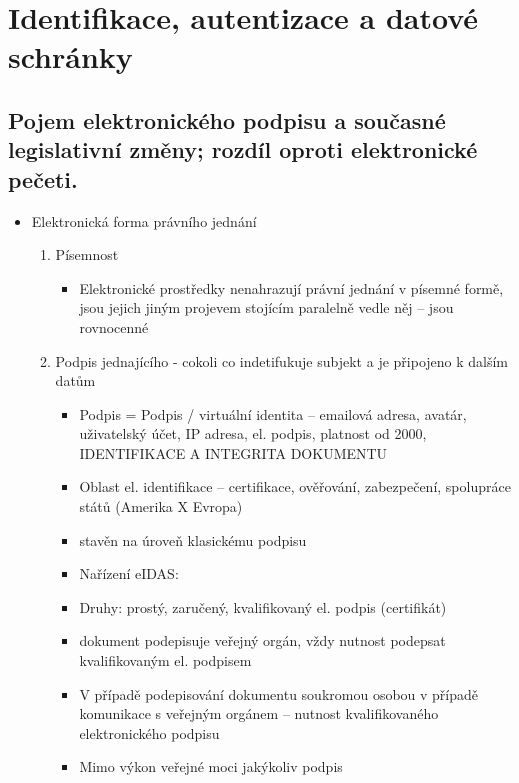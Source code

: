 \section{Identifikace, autentizace a datové schránky}

\subsection{Pojem elektronického podpisu a současné legislativní změny; rozdíl oproti elektronické pečeti.}
\begin{itemize}
      \item  Elektronická forma právního jednání
            \begin{enumerate}
                  \item Písemnost
                        \begin{itemize}
                              \item Elektronické prostředky nenahrazují právní jednání v písemné formě, jsou jejich jiným
                                    projevem stojícím paralelně vedle něj – jsou rovnocenné
                        \end{itemize}
                  \item Podpis jednajícího - cokoli co indetifukuje subjekt a je připojeno k dalším datům
                        \begin{itemize}
                              \item Podpis = Podpis / virtuální identita – emailová adresa, avatár, uživatelský účet, IP adresa, el.
                                    podpis, platnost od 2000, IDENTIFIKACE A INTEGRITA DOKUMENTU
                              \item Oblast el. identifikace – certifikace, ověřování, zabezpečení, spolupráce států (Amerika X Evropa)
                              \item stavěn na úroveň klasickému podpisu
                              \item Nařízení eIDAS: 
                              \item Druhy: prostý, zaručený, kvalifikovaný el. podpis (certifikát)
                              \item dokument podepisuje veřejný orgán, vždy nutnost podepsat kvalifikovaným el. podpisem
                              \item  V případě podepisování dokumentu soukromou osobou v případě komunikace s veřejným
                                    orgánem – nutnost kvalifikovaného elektronického podpisu
                              \item Mimo výkon veřejné moci jakýkoliv podpis



\end{itemize}
\end{enumerate}
\end{itemize}
